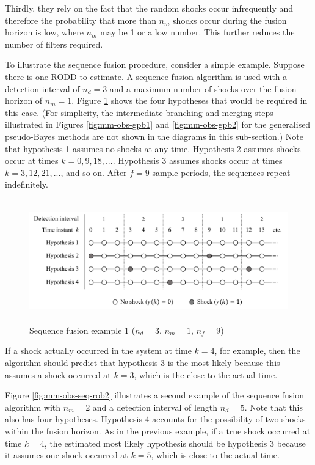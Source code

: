 Thirdly, they rely on the fact that the random shocks occur infrequently and therefore the probability that more than $n_m$ shocks occur during the fusion horizon is low, where $n_m$ may be 1 or a low number. This further reduces the number of filters required.

To illustrate the sequence fusion procedure, consider a simple example. Suppose there is one RODD to estimate. A sequence fusion algorithm is used with a detection interval of $n_d=3$ and a maximum number of shocks over the fusion horizon of $n_m=1$. Figure \ref{fig:mm-obs-seq-rob1} shows the four hypotheses that would be required in this case. (For simplicity, the intermediate branching and merging steps illustrated in Figures \ref{fig:mm-obs-gpb1} and \ref{fig:mm-obs-gpb2} for the generalised pseudo-Bayes methods are not shown in the diagrams in this sub-section.) Note that hypothesis 1 assumes no shocks at any time. Hypothesis 2 assumes shocks occur at times $k=0,9,18,...$. Hypothesis 3 assumes shocks occur at times $k=3,12,21,...$, and so on. After $f=9$ sample periods, the sequences repeat indefinitely.

\begin{figure}[htp]
	\centering
	\includegraphics[height=5.3cm]{images/mm_obs_seq_rob1.pdf}
	\caption{Sequence fusion example 1 ($n_d=3$, $n_m=1$, $n_f=9$)}
	\label{fig:mm-obs-seq-rob1}
\end{figure}

If a shock actually occurred in the system at time $k=4$, for example, then the algorithm should predict that hypothesis 3 is the most likely because this assumes a shock occurred at $k=3$, which is the close to the actual time.

Figure \ref{fig:mm-obs-seq-rob2} illustrates a second example of the sequence fusion algorithm with $n_m=2$ and a detection interval of length $n_d=5$.  Note that this also has four hypotheses. Hypothesis 4 accounts for the possibility of two shocks within the fusion horizon. As in the previous example, if a true shock occurred at time $k=4$, the estimated most likely hypothesis should be hypothesis 3 because it assumes one shock occurred at $k=5$, which is close to the actual time.

